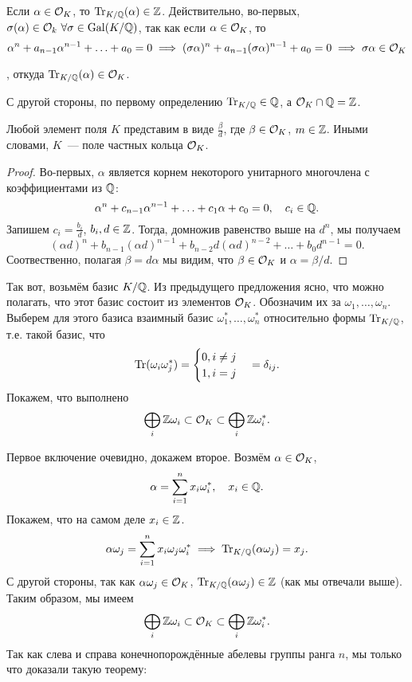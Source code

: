 	\begin{remark}
		Если $\alpha \in \mathcal{O}_{K}$, то $\operatorname{Tr}_{K/\mathbb{Q}}(\alpha) \in \mathbb{Z}$. Действительно, во-первых, $\sigma(\alpha) \in \mathcal{O}_k \ \forall \sigma \in \operatorname{Gal}(K/\mathbb{Q})$, так как если $\alpha \in \mathcal{O}_{K}$, то 
		\[
			\alpha^n + a_{n - 1} \alpha^{n - 1} + \ldots + a_0 = 0 \implies (\sigma\alpha)^n + a_{n - 1} (\sigma \alpha)^{n - 1} + a_0 = 0 \implies \sigma\alpha \in \mathcal{O}_{K}
		\]

		, откуда $\operatorname{Tr}_{K/\mathbb{Q}}(\alpha) \in \mathcal{O}_{K}$.

		С другой стороны, по первому определению $\operatorname{Tr}_{K/\mathbb{Q}} \in \mathbb{Q}$, а $\mathcal{O}_{K} \cap \mathbb{Q} = \mathbb{Z}$. 
	\end{remark}

	\begin{statement}
		Любой элемент поля $K$ представим в виде $\frac{\beta}{d}$, где $\beta \in \mathcal{O}_{K}$, $m \in \mathbb{Z}$. Иными словами, $K$~--- поле частных кольца $\mathcal{O}_{K}$. 
	\end{statement}
	\begin{proof}
		Во-первых, $\alpha$ является корнем некоторого унитарного многочлена с коэффициентами из $\mathbb{Q}$:
		\[
			\alpha^n + c_{n - 1}\alpha^{n - 1} + \ldots + c_{1}\alpha + c_0 = 0, \quad c_i \in \mathbb{Q}.
		\]
		Запишем $c_i = \frac{b_i}{d}$, $b_i, d \in \mathbb{Z}$. Тогда, домножив равенство выше на $d^n$, мы получаем  
		\[
			(\alpha d)^n + b_{n - 1}(\alpha d)^{n - 1} + b_{n - 2} d (\alpha d)^{n - 2} + \ldots + b_0 d^{n - 1} = 0.
		\]
		Соотвественно, полагая $\beta = d\alpha$ мы видим, что $\beta \in \mathcal{O}_{K}$ и $\alpha = \beta / d$. 
	\end{proof}

	Так вот, возьмём базис $K/\mathbb{Q}$. Из предыдущего предложения ясно, что можно полагать, что этот базис состоит из элементов $\mathcal{O}_{K}$. Обозначим их за $\omega_1, \ldots, \omega_n$. Выберем для этого базиса взаимный базис $\omega_1^*, \ldots, \omega_n^*$ относительно формы $\operatorname{Tr}_{K/\mathbb{Q}}$, т.е. такой базис, что 
	\[
		\operatorname{Tr}(\omega_i \omega_j^*) = \begin{cases} 0, i \neq j \\ 1, i = j \end{cases} = \delta_{i j}.
	\]
	Покажем, что выполнено 
	\[
		\bigoplus_{i} \mathbb{Z} \omega_i \subset \mathcal{O}_{K} \subset \bigoplus_{i} \mathbb{Z} \omega_i^{*}.
	\]

	Первое включение очевидно, докажем второе. Возмём $\alpha \in \mathcal{O}_{K}$,
	\[
	 	\alpha = \sum_{i = 1}^{n} x_i \omega_i^{*}, \quad x_i \in \mathbb{Q}.
	 \] 
	 Покажем, что на самом деле $x_i \in \mathbb{Z}$. 
	 \[
	 	\alpha \omega_j = \sum_{i = 1}^{n} x_i \omega_j \omega_i^{*} \implies \operatorname{Tr}_{K/\mathbb{Q}}(\alpha \omega_j) = x_j. 
	 \]
	 С другой стороны, так как $\alpha \omega_j \in \mathcal{O}_{K}$, $\operatorname{Tr}_{K/\mathbb{Q}}(\alpha \omega_j) \in \mathbb{Z}$ (как мы отвечали выше). Таким образом, мы имеем  
	 \[
		\bigoplus_{i} \mathbb{Z} \omega_i \subset \mathcal{O}_{K} \subset \bigoplus_{i} \mathbb{Z} \omega_i^{*}.
	\]
	Так как слева и справа конечнопорождённые абелевы группы ранга $n$, мы только что доказали такую теорему: 

